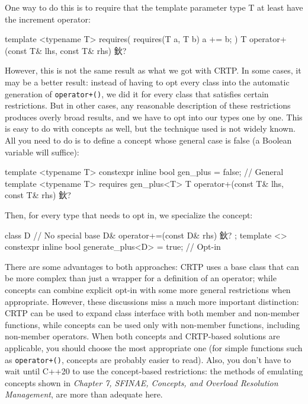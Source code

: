 One way to do this is to require that the template parameter type T at least have the increment operator:

\begin{code}
template <typename T>
requires( requires(T a, T b) { a += b; } )
T operator+(const T& lhs, const T& rhs) { 鈥?}
\end{code}

However, this is not the same result as what we got with CRTP. In some cases, it may be a better result: instead of having to opt every class into the automatic generation of \texttt{operator+()}, we did it for every class that satisfies certain restrictions. But in other cases, any reasonable description of these restrictions produces overly broad results, and we have to opt into our types one by one. This is easy to do with concepts as well, but the technique used is not widely known. All you need to do is to define a concept whose general case is false (a Boolean variable will suffice):

\begin{code}
template <typename T>
constexpr inline bool gen_plus = false; // General
template <typename T>
requires gen_plus<T>
T operator+(const T& lhs, const T& rhs) { 鈥?}
\end{code}

Then, for every type that needs to opt in, we specialize the concept:

\begin{code}
class D { // No special base
  D& operator+=(const D& rhs) { 鈥?}
};
template <>
constexpr inline bool generate_plus<D> = true; // Opt-in
\end{code}

There are some advantages to both approaches: CRTP uses a base class that can be more complex than just a wrapper for a definition of an operator; while concepts can combine explicit opt-in with some more general restrictions when appropriate. However, these discussions miss a much more important distinction: CRTP can be used to expand class interface with both member and non-member functions, while concepts can be used only with non-member functions, including non-member operators. When both concepts and CRTP-based solutions are applicable, you should choose the most appropriate one (for simple functions such as \texttt{operator+()}, concepts are probably easier to read). Also, you don't have to wait until C++20 to use the concept-based restrictions: the methods of emulating concepts shown in \emph{Chapter 7, SFINAE, Concepts, and Overload Resolution Management}, are more than adequate here.


